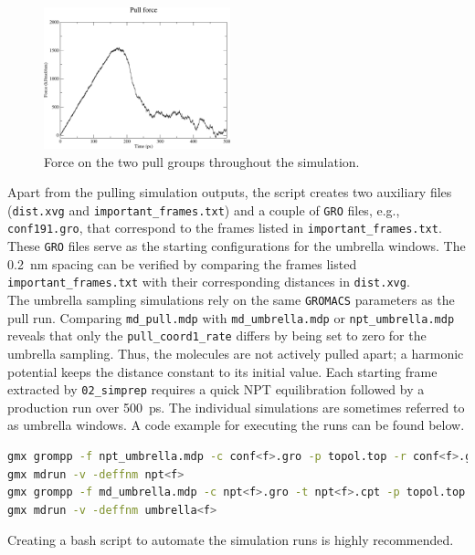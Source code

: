 \documentclass[9pt,tutorial]{livecoms}
\newcommand{\code}[1]{\colorbox{light-gray}{\texttt{#1}}}
\begin{document}
\begin{figure}[H]
    \centering
    \includegraphics[width=0.48\textwidth]{figures/pullf.pdf}
    \caption{Force on the two pull groups throughout the simulation.}
    \label{fig:pullxvg}
\end{figure}
Apart from the pulling simulation outputs, the script creates two auxiliary files (\code{dist.xvg} and \code{important\_frames.txt}) and a couple of \texttt{GRO} files, e.g., \code{conf191.gro}, that correspond to the frames listed in \code{important\_frames.txt}. These \texttt{GRO} files serve as the starting configurations for the umbrella windows. The \SI{0.2}{\nano\meter} spacing can be verified by comparing the frames listed \code{important\_frames.txt} with their corresponding distances in \code{dist.xvg}.\\
The umbrella sampling simulations rely on the same \texttt{GROMACS} parameters as the pull run. Comparing \code{md\_pull.mdp} with \code{md\_umbrella.mdp} or \code{npt\_umbrella.mdp} reveals that only the \code{pull\_coord1\_rate} differs by being set to zero for the umbrella sampling. Thus, the molecules are not actively pulled apart; a harmonic potential keeps the distance constant to its initial value. Each starting frame extracted by \code{02\_simprep} requires a quick NPT equilibration followed by a production run over \SI{500}{\pico\second}. The individual simulations are sometimes referred to as umbrella windows. A code example for executing the runs can be found below. 
\begin{lstlisting}[language=bash]
gmx grompp -f npt_umbrella.mdp -c conf<f>.gro -p topol.top -r conf<f>.gro -n index.ndx -o npt<f>.tpr
gmx mdrun -v -deffnm npt<f>
gmx grompp -f md_umbrella.mdp -c npt<f>.gro -t npt<f>.cpt -p topol.top -r npt<f>.gro -n index.ndx -o umbrella<f>.tpr
gmx mdrun -v -deffnm umbrella<f>
\end{lstlisting}
Creating a bash script to automate the simulation runs is highly recommended.\\
\end{document}
